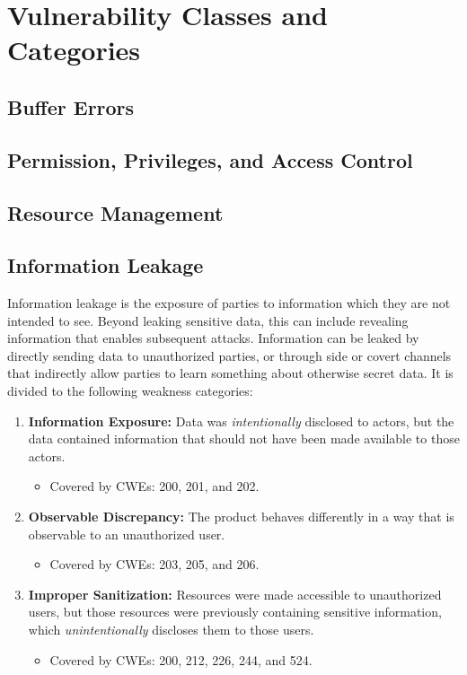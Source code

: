 \documentclass{article}
\begin{document}
\section{Vulnerability Classes and Categories}
\label{sec:classes}

\subsection{Buffer Errors}

\subsection{Permission, Privileges, and Access Control}

\subsection{Resource Management}

\subsection{Information Leakage}
Information leakage is the exposure of parties to information which they are not intended to see. Beyond leaking sensitive data, this can include revealing information that enables subsequent attacks. Information can be leaked by directly sending data to unauthorized parties, or through side or covert channels that indirectly allow parties to learn something about otherwise secret data. It is divided to the following weakness categories:
\begin{enumerate}
    \item \textbf{Information Exposure:} Data was \textit{intentionally} disclosed to actors, but the data contained information that should not have been made available to those actors.
    \begin{itemize}
        \item Covered by CWEs: 200, 201, and 202.
    \end{itemize}
    
    \item \textbf{Observable Discrepancy:} The product behaves differently in a way that is observable to an unauthorized user.
    \begin{itemize}
        \item Covered by CWEs: 203, 205, and 206.
    \end{itemize}
    
    \item \textbf{Improper Sanitization:} Resources were made accessible to unauthorized users, but those resources were previously containing sensitive information, which \textit{unintentionally} discloses them to those users.
    \begin{itemize}
        \item Covered by CWEs: 200, 212, 226, 244, and 524.
    \end{itemize}
\end{enumerate}   
\end{document}
